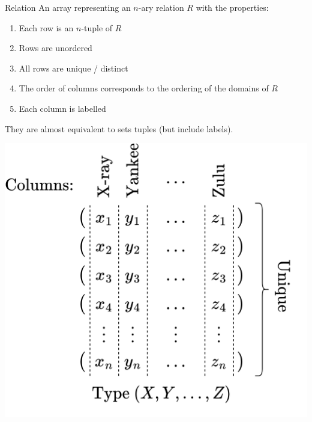\begin{definitionbox}{Relation}
  An array representing an $n$-ary relation $R$ with the properties:
  \\ \begin{minipage}{.49\textwidth}
    \begin{enumerate}
      \setlength\itemsep{0em}
      \item Each row is an $n$-tuple of $R$
      \item Rows are unordered
      \item All rows are unique / distinct
      \item The order of columns corresponds to the ordering of the domains of $R$
      \item Each column is labelled
    \end{enumerate}
    They are almost equivalent to sets tuples (but include labels).
  \end{minipage}
  \hfill
  \begin{minipage}{.5\textwidth}
    \begin{center}
      \includegraphics[width=\textwidth]{relational_algebra/images/relation.drawio.png}
    \end{center}
  \end{minipage}
\end{definitionbox}

